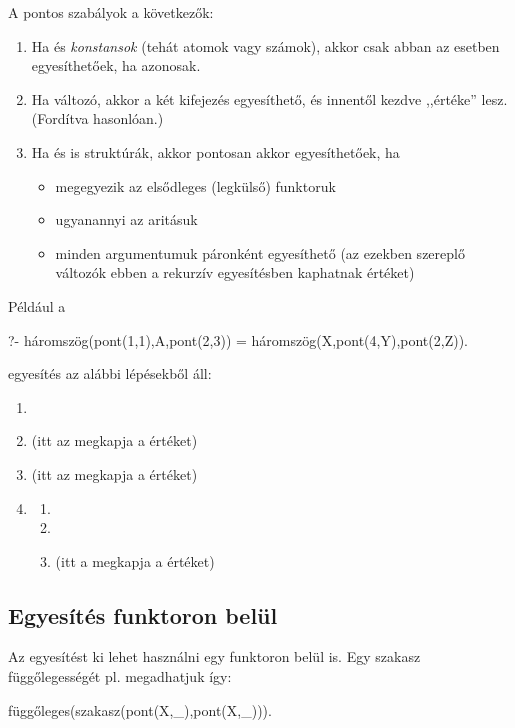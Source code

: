 A pontos szabályok a következők:
\begin{enumerate}
\item Ha  és  \emph{konstansok} (tehát
  atomok vagy számok), akkor csak abban az esetben
  egyesíthetőek, ha azonosak.
\item Ha  változó, akkor a két kifejezés
  egyesíthető, és innentől kezdve  ,,értéke''
   lesz. (Fordítva hasonlóan.)
\item Ha  és  is struktúrák, akkor pontosan akkor egyesíthetőek, ha
  \begin{itemize}
  \item megegyezik az elsődleges (legkülső) funktoruk
  \item ugyanannyi az aritásuk
  \item minden argumentumuk páronként egyesíthető
    (az ezekben szereplő változók ebben a rekurzív
    egyesítésben kaphatnak értéket)
  \end{itemize}
\end{enumerate}

Például a
\begin{query}
?- háromszög(pont(1,1),A,pont(2,3)) =
   háromszög(X,pont(4,Y),pont(2,Z)).
\end{query}
egyesítés az alábbi lépésekből áll:
\begin{enumerate}
\item {}
\item {}
  (itt az  megkapja a  értéket)
\item {}
  (itt az  megkapja a  értéket)
\item {}
  \begin{enumerate}
    \item {}
    \item {}
    \item {}
      (itt a  megkapja a  értéket)
  \end{enumerate}
\end{enumerate}

\subsection*{Egyesítés funktoron belül}
	
Az egyesítést ki lehet használni egy funktoron belül
is. Egy szakasz függőlegességét pl. megadhatjuk így:
\begin{query}
függőleges(szakasz(pont(X,_),pont(X,_))).
\end{query}

